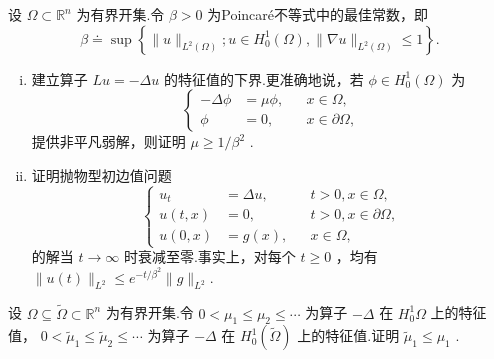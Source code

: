 \begin{rbhw}
设 $\Omega  \subset  {\mathbb{R}}^{n}$ 为有界开集.令 $\beta  > 0$ 为Poincaré不等式中的最佳常数，即
\[
\beta  \doteq  \sup \left\{  {\| u{\| }_{{L}^{2}\left( \Omega \right) };u \in  {H}_{0}^{1}\left( \Omega \right) ,\| \nabla u{\| }_{{L}^{2}\left( \Omega \right) } \leq  1}\right\}  .
\]
\begin{enumerate}[(i)]
    \item 建立算子 ${Lu} =  - {\Delta u}$ 的特征值的下界.更准确地说，若 $\phi  \in  {H}_{0}^{1}\left( \Omega \right)$ 为
\[
\left\{  \begin{aligned}  - {\Delta \phi } &  = {\mu \phi }, & & x \in  \Omega , \\  \phi &  = 0, & & x \in  \partial \Omega , \end{aligned}\right.
\]
提供非平凡弱解，则证明 $\mu  \geq  1/{\beta }^{2}$ .
    \item 证明抛物型初边值问题
\[
\left\{  \begin{aligned} {u}_{t} &  = {\Delta u}, & & t > 0,x \in  \Omega , \\  u\left( {t,x}\right) &  = 0, & & t > 0,x \in  \partial \Omega , \\  u\left( {0,x}\right) &  = g\left( x\right) , & & x \in  \Omega , \end{aligned}\right.
\]
的解当 $t \rightarrow  \infty$ 时衰减至零.事实上，对每个 $t \geq  0$ ，均有 $\| u\left( t\right) {\| }_{{L}^{2}} \leq  {e}^{-t/{\beta }^{2}}\| g{\| }_{{L}^{2}}$.
\end{enumerate}
\end{rbhw}

\begin{rbhw}
设 $\Omega  \subseteq  \widetilde{\Omega } \subset  {\mathbb{R}}^{n}$ 为有界开集.令 $0 < {\mu }_{1} \leq  {\mu }_{2} \leq  \cdots$ 为算子 $- \Delta$ 在 ${H}_{0}^{1}\Omega$ 上的特征值， $0 < {\widetilde{\mu }}_{1} \leq  {\widetilde{\mu }}_{2} \leq  \cdots$ 为算子 $- \Delta$ 在 ${H}_{0}^{1}\left( \widetilde{\Omega }\right)$ 上的特征值.证明 ${\widetilde{\mu }}_{1} \leq  {\mu }_{1}$ .
\end{rbhw}

